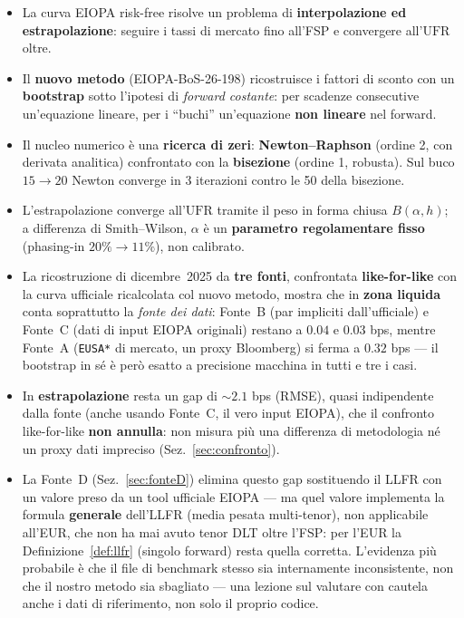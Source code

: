 \documentclass[11pt,a4paper]{article}
\theoremstyle{plain}
\theoremstyle{definition}
\theoremstyle{remark}
\newcommand{\UFR}{\mathrm{UFR}}
\begin{document}
\begin{itemize}
  \item La curva EIOPA risk-free risolve un problema di \textbf{interpolazione ed
        estrapolazione}: seguire i tassi di mercato fino all'FSP e convergere all'$\UFR$ oltre.
  \item Il \textbf{nuovo metodo} (EIOPA-BoS-26-198) ricostruisce i fattori di sconto con un
        \textbf{bootstrap} sotto l'ipotesi di \emph{forward costante}: per scadenze consecutive
        un'equazione lineare, per i ``buchi'' un'equazione \textbf{non lineare} nel forward.
  \item Il nucleo numerico \`e una \textbf{ricerca di zeri}: \textbf{Newton--Raphson} (ordine
        2, con derivata analitica) confrontato con la \textbf{bisezione} (ordine 1, robusta).
        Sul buco $15\!\to\!20$ Newton converge in 3 iterazioni contro le 50 della bisezione.
  \item L'estrapolazione converge all'$\UFR$ tramite il peso in forma chiusa $B(\alpha,h)$;
        a differenza di Smith--Wilson, $\alpha$ \`e un \textbf{parametro regolamentare fisso}
        (phasing-in $20\%\!\to\!11\%$), non calibrato.
  \item La ricostruzione di dicembre~2025 da \textbf{tre fonti}, confrontata
        \textbf{like-for-like} con la curva ufficiale ricalcolata col nuovo metodo, mostra che
        in \textbf{zona liquida} conta soprattutto la \emph{fonte dei dati}: Fonte~B (par
        impliciti dall'ufficiale) e Fonte~C (dati di input EIOPA originali) restano a $0.04$ e
        $0.03$ bps, mentre Fonte~A (\texttt{EUSA*} di mercato, un proxy Bloomberg) si ferma a
        $0.32$ bps --- il bootstrap in s\'e \`e per\`o esatto a precisione macchina in tutti
        e tre i casi.
  \item In \textbf{estrapolazione} resta un gap di $\sim 2.1$ bps (RMSE), quasi indipendente
        dalla fonte (anche usando Fonte~C, il vero input EIOPA), che il confronto like-for-like
        \textbf{non annulla}: non misura pi\`u una differenza di metodologia n\'e un proxy dati
        impreciso (Sez.~\ref{sec:confronto}).
  \item La Fonte~D (Sez.~\ref{sec:fonteD}) elimina questo gap sostituendo il LLFR con un
        valore preso da un tool ufficiale EIOPA --- ma quel valore implementa la formula
        \textbf{generale} dell'LLFR (media pesata multi-tenor), non applicabile all'EUR, che
        non ha mai avuto tenor DLT oltre l'FSP: per l'EUR la Definizione~\ref{def:llfr} (singolo
        forward) resta quella corretta. L'evidenza pi\`u probabile \`e che il file di benchmark
        stesso sia internamente inconsistente, non che il nostro metodo sia sbagliato --- una
        lezione sul valutare con cautela anche i dati di riferimento, non solo il proprio codice.
\end{itemize}
\end{document}
